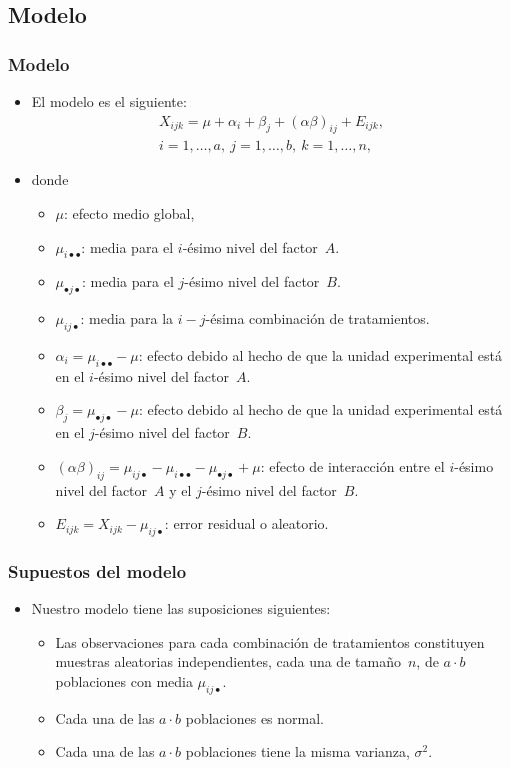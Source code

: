 \subsection{Modelo}
\begin{frame}
\frametitle{Modelo}
{\small
\begin{itemize}
\item<2-> El modelo es el siguiente:
\[
\begin{array}{l}
X_{ijk} = \mu + \alpha_i + \beta_j + (\alpha\beta)_{ij}+E_{ijk},\\
i=1,\ldots,a,\ j=1,\ldots,b,\ k=1,\ldots,n,
\end{array}\]
\item<3-> donde
\begin{itemize}
\item<4-> $\mu$: efecto medio global,
\item<5-> $\mu_{i\bullet\bullet}$: media para el $i$-ésimo nivel del factor~$A$.
\item<6-> $\mu_{\bullet j\bullet}$: media para el $j$-ésimo nivel del factor~$B$.
\item<7-> $\mu_{ij\bullet}$: media para la $i-j$-ésima combinación de tratamientos.
\item<8-> $\alpha_i =\mu_{i\bullet\bullet}-\mu$: efecto debido al hecho de que la unidad experimental está en el $i$-ésimo nivel del factor~$A$.
\item<9-> $\beta_j =\mu_{\bullet j\bullet}-\mu$: efecto debido al hecho de que la unidad experimental está en el $j$-ésimo nivel del factor~$B$.
\item<10-> $(\alpha\beta)_{ij}=\mu_{ij\bullet}-\mu_{i\bullet\bullet}-\mu_{\bullet j\bullet}+\mu$: efecto de interacción entre el $i$-ésimo nivel del factor~$A$ y el $j$-ésimo nivel del factor~$B$.
\item<11-> $E_{ijk}=X_{ijk}-\mu_{ij\bullet}$: error residual o aleatorio.
\end{itemize}
\end{itemize}}
\end{frame}
\begin{frame}
\frametitle{Supuestos del modelo}
\begin{itemize}
\item<2-> Nuestro modelo tiene las suposiciones siguientes:
\begin{itemize}
\item<3-> Las observaciones para cada combinación de tratamientos constituyen muestras aleatorias independientes, cada una de tamaño~$n$, de $a\cdot b$ poblaciones con media $\mu_{ij\bullet}$.
\item<4-> Cada una de las $a\cdot b$ poblaciones es normal.
\item<5-> Cada una de las $a\cdot b$ poblaciones tiene la misma varianza, $\sigma^2$.
\end{itemize}
\end{itemize}
\end{frame}

